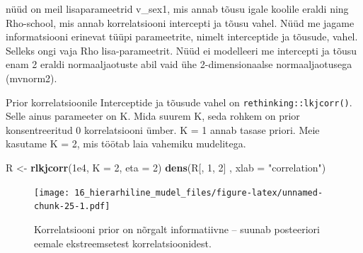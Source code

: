 \documentclass[]{book}
\newenvironment{Shaded}{\begin{snugshade}}{\end{snugshade}}
\newcommand{\KeywordTok}[1]{\textcolor[rgb]{0.13,0.29,0.53}{\textbf{#1}}}
\newcommand{\DataTypeTok}[1]{\textcolor[rgb]{0.13,0.29,0.53}{#1}}
\newcommand{\DecValTok}[1]{\textcolor[rgb]{0.00,0.00,0.81}{#1}}
\newcommand{\FloatTok}[1]{\textcolor[rgb]{0.00,0.00,0.81}{#1}}
\newcommand{\StringTok}[1]{\textcolor[rgb]{0.31,0.60,0.02}{#1}}
\newcommand{\NormalTok}[1]{#1}
\begin{document}
nüüd on meil lisaparameetrid v\_sex1, mis annab tõusu igale koolile
eraldi ning Rho-school, mis annab korrelatsiooni intercepti ja tõusu
vahel. Nüüd me jagame informatsiooni erinevat tüüpi parameetrite, nimelt
interceptide ja tõusude, vahel. Selleks ongi vaja Rho lisa-parameetrit.
Nüüd ei modelleeri me intercepti ja tõusu enam 2 eraldi normaaljaotuste
abil vaid ühe 2-dimensionaalse normaaljaotusega (mvnorm2).

Prior korrelatsioonile Interceptide ja tõusude vahel on
\texttt{rethinking::lkjcorr()}. Selle ainus parameeter on K. Mida suurem
K, seda rohkem on prior konsentreeritud 0 korrelatsiooni ümber. K = 1
annab tasase priori. Meie kasutame K = 2, mis töötab laia vahemiku
mudelitega.

\begin{Shaded}
\begin{Highlighting}[]
\NormalTok{R <-}\StringTok{ }\KeywordTok{rlkjcorr}\NormalTok{(}\FloatTok{1e4}\NormalTok{, }\DataTypeTok{K =} \DecValTok{2}\NormalTok{, }\DataTypeTok{eta =} \DecValTok{2}\NormalTok{)}
\KeywordTok{dens}\NormalTok{(R[, }\DecValTok{1}\NormalTok{, }\DecValTok{2}\NormalTok{] , }\DataTypeTok{xlab =} \StringTok{"correlation"}\NormalTok{)}
\end{Highlighting}
\end{Shaded}

\begin{figure}
\centering
\texttt{[image: 16\_hierarhiline\_mudel\_files/figure-latex/unnamed-chunk-25-1.pdf]}
\caption{\label{fig:unnamed-chunk-25}Korrelatsiooni prior on nõrgalt
informatiivne -- suunab posteeriori eemale ekstreemsetest
korrelatsioonidest.}
\end{figure}
\end{document}
